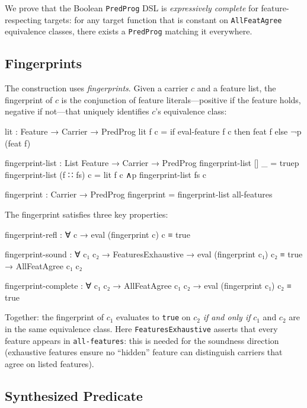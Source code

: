 \documentclass[9pt,a4paper]{article}
\theoremstyle{plain}
\theoremstyle{definition}
\theoremstyle{remark}
\begin{document}
We prove that the Boolean \texttt{PredProg} DSL is \emph{expressively complete} for feature-respecting targets: for any target function that is constant on \texttt{AllFeatAgree} equivalence classes, there exists a \texttt{PredProg} matching it everywhere.

\subsection{Fingerprints}

The construction uses \emph{fingerprints}.  Given a carrier $c$ and a feature list, the fingerprint of $c$ is the conjunction of feature literals---positive if the feature holds, negative if not---that uniquely identifies $c$'s equivalence class:

\begin{spec}
    lit : Feature → Carrier → PredProg
    lit f c = if eval-feature f c then feat f else ¬p (feat f)

    fingerprint-list : List Feature → Carrier → PredProg
    fingerprint-list []       _ = truep
    fingerprint-list (f ∷ fs) c = lit f c ∧p fingerprint-list fs c

    fingerprint : Carrier → PredProg
    fingerprint = fingerprint-list all-features
\end{spec}

\noindent The fingerprint satisfies three key properties:

\begin{spec}
    fingerprint-refl     : ∀ c → eval (fingerprint c) c ≡ true

    fingerprint-sound    : ∀ c₁ c₂ → FeaturesExhaustive →
      eval (fingerprint c₁) c₂ ≡ true → AllFeatAgree c₁ c₂

    fingerprint-complete : ∀ c₁ c₂ →
      AllFeatAgree c₁ c₂ → eval (fingerprint c₁) c₂ ≡ true
\end{spec}

\noindent Together: the fingerprint of $c_1$ evaluates to \texttt{true} on $c_2$ \emph{if and only if} $c_1$ and $c_2$ are in the same equivalence class.
Here \texttt{FeaturesExhaustive} asserts that every feature appears in \texttt{all-features}: this is needed for the soundness direction (exhaustive features ensure no ``hidden'' feature can distinguish carriers that agree on listed features).

\subsection{Synthesized Predicate}
\end{document}
